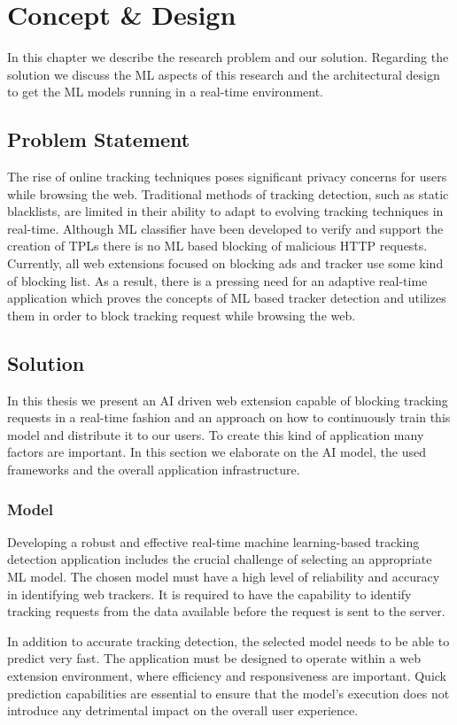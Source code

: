 \chapter{Concept \& Design}

In this chapter we describe the research problem and our solution. Regarding the solution we discuss 
the ML aspects of this research and the architectural design to get the ML models running in a real-time
environment.

\section{Problem Statement}
The rise of online tracking techniques poses significant privacy concerns for users while browsing the web.
Traditional methods of tracking detection, such as static blacklists, are limited in their ability to adapt
to evolving tracking techniques in real-time. Although ML classifier have been developed to verify and support
the creation of TPLs there is no ML based blocking of malicious HTTP requests. Currently, all web extensions focused on blocking
ads and tracker use some kind of blocking list. As a result, there is a pressing need for an adaptive real-time application which
proves the concepts of ML based tracker detection and utilizes them in order to block tracking request while browsing the web.
\section{Solution}
In this thesis we present an AI driven web extension capable of blocking tracking requests in a real-time fashion and an approach on how
to continuously train this model and distribute it to our users. To create this kind of application many factors are important. In this 
section we elaborate on the AI model, the used frameworks and the overall application infrastructure.
\subsection{Model}
Developing a robust and effective real-time machine learning-based tracking detection application includes the crucial challenge
of selecting an appropriate ML model. The chosen model must have a high level of reliability and accuracy in identifying web
trackers. It is required to have the capability to identify tracking requests from the data available before the request is sent
to the server.

In addition to accurate tracking detection, the selected model needs to be able to predict very fast.
The application must be designed to operate within a web extension environment, where efficiency and responsiveness are important.
Quick prediction capabilities are essential to ensure that the model's execution does not introduce any detrimental impact on
the overall user experience.

